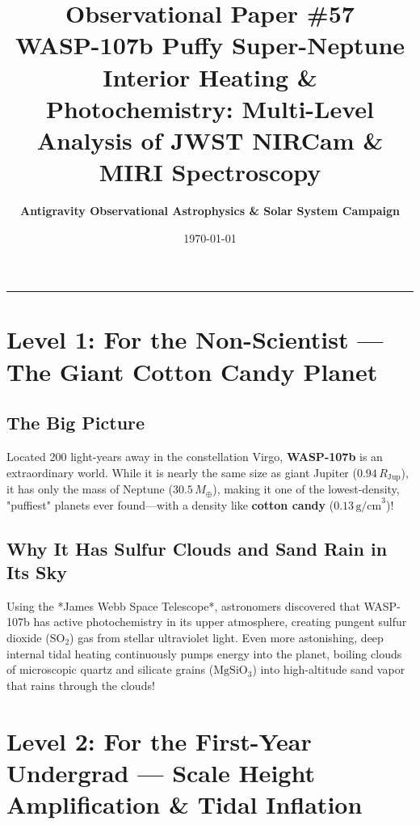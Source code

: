 \documentclass[11pt,a4paper]{article}
\title{\Huge \textbf{Observational Paper \#57}\\ \Large WASP-107b Puffy Super-Neptune Interior Heating \& Photochemistry: Multi-Level Analysis of JWST NIRCam \& MIRI Spectroscopy}
\author{\textbf{Antigravity Observational Astrophysics \& Solar System Campaign}}
\date{\today}
\begin{document}
\maketitle

\vspace{-1em}
\begin{center}
\rule{\textwidth}{1.5pt}
\end{center}

\section*{Level 1: For the Non-Scientist — The Giant Cotton Candy Planet}

\subsection*{The Big Picture}
Located 200 light-years away in the constellation Virgo, \textbf{WASP-107b} is an extraordinary world. While it is nearly the same size as giant Jupiter ($0.94\,R_{\text{Jup}}$), it has only the mass of Neptune ($30.5\,M_\oplus$), making it one of the lowest-density, "puffiest" planets ever found—with a density like \textbf{cotton candy} ($0.13\,\text{g/cm}^3$)!

\subsection*{Why It Has Sulfur Clouds and Sand Rain in Its Sky}
Using the *James Webb Space Telescope*, astronomers discovered that WASP-107b has active photochemistry in its upper atmosphere, creating pungent sulfur dioxide ($\mathrm{SO_2}$) gas from stellar ultraviolet light. Even more astonishing, deep internal tidal heating continuously pumps energy into the planet, boiling clouds of microscopic quartz and silicate grains ($\mathrm{MgSiO_3}$) into high-altitude sand vapor that rains through the clouds!

\newpage

\section*{Level 2: For the First-Year Undergrad — Scale Height Amplification \& Tidal Inflation}
\end{document}
